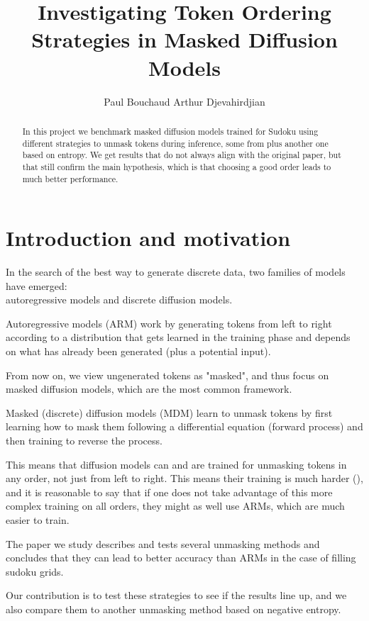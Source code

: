 \documentclass{article}
\title{Investigating Token Ordering Strategies in Masked
Diffusion Models}
\author{
    Paul Bouchaud
    \And
    Arthur Djevahirdjian
}
\begin{document}
\maketitle

\begin{abstract}
In this project we benchmark masked diffusion models trained for Sudoku using different strategies to unmask tokens during inference, some from \citet{kim2025trainworstplanbest} plus another one based on entropy. We get results that do not always align with the original paper, but that still confirm the main hypothesis, which is that choosing a good order leads to much better performance.

\end{abstract}

\section{Introduction and motivation}
In the search of the best way to generate discrete data, two families of models have emerged:\\
autoregressive models and discrete diffusion models.

Autoregressive models (ARM) work by generating tokens from left to right according to a distribution
that gets learned in the training phase and depends on what has already been generated (plus a potential input).

From now on, we view ungenerated tokens as "masked", and thus focus on masked diffusion models, which are the most common
framework.

Masked (discrete) diffusion models (MDM) learn to unmask tokens by first learning
how to mask them following a differential equation (forward process) and then training to reverse the process.

This means that diffusion models can and are trained for unmasking tokens in any order, not just from left to right.
This means their training is much harder (\citet{kim2025trainworstplanbest}), and it is reasonable to say that if one does not take advantage of this more complex training on all orders, they might as well use ARMs, which are much easier to train. %

The paper \citet{kim2025trainworstplanbest} we study describes and tests several unmasking methods and concludes that they can lead to better accuracy than ARMs in the case of filling sudoku grids.

Our contribution is to test these strategies to see if the results line up, and we also compare them to another
unmasking method based on negative entropy.
\end{document}
